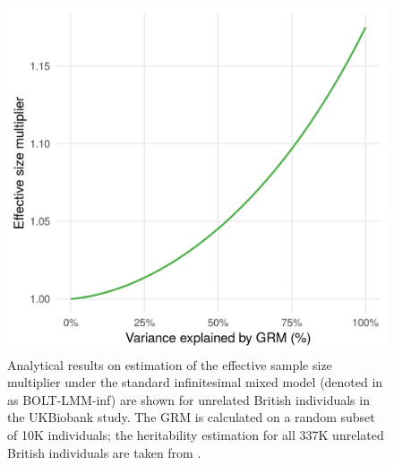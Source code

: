 \documentclass[]{book}
\begin{document}
\begin{figure}

{\centering \includegraphics[width=0.75\linewidth]{figures/10-figure-power-marginal-ukbiobank} 

}

\caption{Analytical results on estimation of the effective sample
size multiplier under the standard infinitesimal mixed model (denoted in
\citep{loh2018mixed} as BOLT-LMM-inf) are shown for unrelated British
individuals in the UKBiobank study. The GRM is calculated on a random
subset of 10K individuals; the heritability estimation for all 337K
unrelated British individuals are taken from \citep[Supplementary Table
2]{loh2018mixed}.}\label{fig:ukbiobank}
\end{figure}
\end{document}
